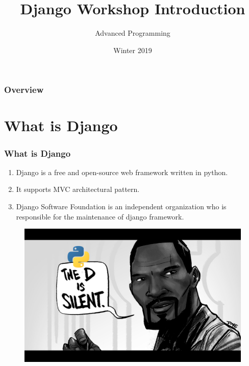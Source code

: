 \documentclass{beamer}
\title[Django Workshop]{Django Workshop Introduction} %
\author{Advanced Programming} %
\institute[AUT] %
{
	Amirkabir University of Technology\\ %
	\medskip
	\textit{} %
}
\date{Winter 2019} %
\begin{document}
	
	\begin{frame}
		\titlepage %
	\end{frame}

	\begin{frame}
	\frametitle{Overview} %
	\tableofcontents %
	\end{frame}


\section{What is Django} 
\begin{frame}
\frametitle{What is Django}
	\begin{enumerate}
	\item Django is a free and open-source web framework written in python.
	\item It supports MVC architectural pattern. 
	\item Django Software Foundation is an independent 
	organization who is responsible for the maintenance of django framework.
	\end{enumerate}
\end{frame}

\begin{frame}
	\begin{figure}
		\includegraphics[width=\linewidth]{Pics/PyDjango.jpg}
	\end{figure}
\end{frame}
\end{document}
